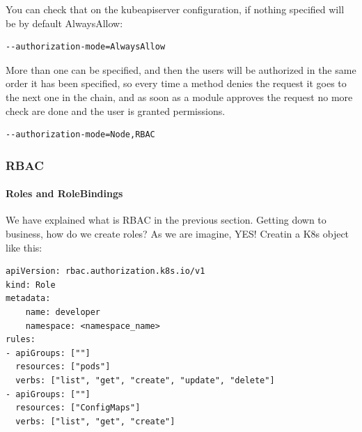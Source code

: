\documentclass{article}
\newenvironment{codetemplate}[1][]{%
  \mybasecolorbox[#1]
  \itshape
}{%
  \endmybasecolorbox
}
\begin{document}
You can check that on the kubeapiserver configuration, if nothing specified will be by default AlwaysAllow:
\begin{codetemplate}{}
\begin{verbatim}
--authorization-mode=AlwaysAllow
\end{verbatim}
\end{codetemplate}

More than one can be specified, and then the users will be authorized in the same order it has been specified, so every time a method denies the request it goes to the next one in the chain, and as soon as a module approves the request no more check are done and the user is granted permissions. 
\begin{codetemplate}{}
\begin{verbatim}
--authorization-mode=Node,RBAC
\end{verbatim}
\end{codetemplate}

\subsubsection{RBAC}
\paragraph{Roles and RoleBindings}
We have explained what is RBAC in the previous section. Getting down to business, how do we create roles? As we are imagine, YES! Creatin a K8s object like this:

\begin{codetemplate}{}
\begin{verbatim}
apiVersion: rbac.authorization.k8s.io/v1
kind: Role
metadata:
    name: developer
    namespace: <namespace_name>
rules:
- apiGroups: [""]
  resources: ["pods"]
  verbs: ["list", "get", "create", "update", "delete"]
- apiGroups: [""]
  resources: ["ConfigMaps"]
  verbs: ["list", "get", "create"]
\end{verbatim}
\end{codetemplate}
\end{document}
